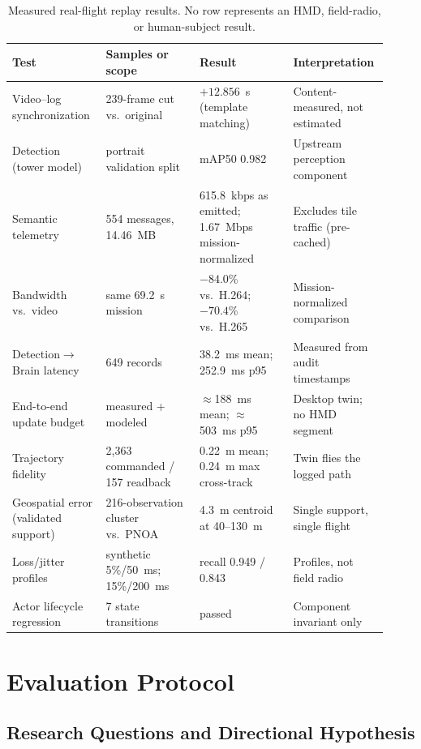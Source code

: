 \documentclass[fleqn]{VRIH2025}
\begin{document}
\begin{table}[H]
\centering
\small
\caption{Measured real-flight replay results. No row represents an HMD, field-radio, or human-subject result.}
\label{tab:real-replay-results}
\begin{tabular}{@{}L{0.24\linewidth}L{0.24\linewidth}L{0.24\linewidth}L{0.20\linewidth}@{}}
\toprule
Test & Samples or scope & Result & Interpretation \\
\midrule
Video--log synchronization & 239-frame cut vs.\ original & $+12.856$~s (template matching) & Content-measured, not estimated \\
Detection (tower model) & portrait validation split & mAP50 0.982 & Upstream perception component \\
Semantic telemetry & 554 messages, 14.46~MB & 615.8~kbps as emitted; 1.67~Mbps mission-normalized & Excludes tile traffic (pre-cached) \\
Bandwidth vs.\ video & same 69.2~s mission & $-84.0$\% vs.\ H.264; $-70.4$\% vs.\ H.265 & Mission-normalized comparison \\
Detection$\to$Brain latency & 649 records & 38.2~ms mean; 252.9~ms p95 & Measured from audit timestamps \\
End-to-end update budget & measured + modeled & $\approx$188~ms mean; $\approx$503~ms p95 & Desktop twin; no HMD segment \\
Trajectory fidelity & 2,363 commanded / 157 readback & 0.22~m mean; 0.24~m max cross-track & Twin flies the logged path \\
Geospatial error (validated support) & 216-observation cluster vs.\ PNOA & 4.3~m centroid at 40--130~m & Single support, single flight \\
Loss/jitter profiles & synthetic 5\%/50~ms; 15\%/200~ms & recall 0.949 / 0.843 & Profiles, not field radio \\
Actor lifecycle regression & 7 state transitions & passed & Component invariant only \\
\bottomrule
\end{tabular}
\end{table}

\section{Evaluation Protocol}

\subsection{Research Questions and Directional Hypothesis}
\end{document}
